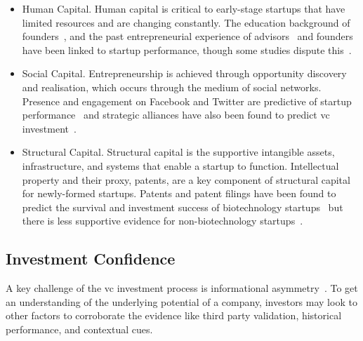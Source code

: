 \documentclass[../thesis/thesis.tex]{subfiles}
\begin{document}
\begin{itemize}

\item Human Capital. Human capital is critical to early-stage startups that have limited resources and are changing constantly. The education background of founders~\cite{beckwith2016,gimmon2010}, and the past entrepreneurial experience of advisors~\cite{baum2004} and founders~\cite{gimmon2010} have been linked to startup performance, though some studies dispute this~\cite{shan2014,conti2013}.

\item Social Capital. Entrepreneurship is achieved through opportunity discovery and realisation, which occurs through the medium of social networks. Presence and engagement on Facebook and Twitter are predictive of startup performance~\cite{cheng2016,beckwith2016} and strategic alliances have also been found to predict \gls{vc} investment~\cite{baum2004}.

\item Structural Capital. Structural capital is the supportive intangible assets, infrastructure, and systems that enable a startup to function. Intellectual property and their proxy, patents, are a key component of structural capital for newly-formed startups. Patents and patent filings have been found to predict the survival and investment success of biotechnology startups~\cite{baum2004,hoenen2014} but there is less supportive evidence for non-biotechnology startups~\cite{gimmon2010,ahlers2015}.

\end{itemize}

\subsection{Investment Confidence}

A key challenge of the \gls{vc} investment process is informational asymmetry~\cite{ahlers2015}. To get an understanding of the underlying potential of a company, investors may look to other factors to corroborate the evidence like third party validation, historical performance, and contextual cues.
\end{document}

